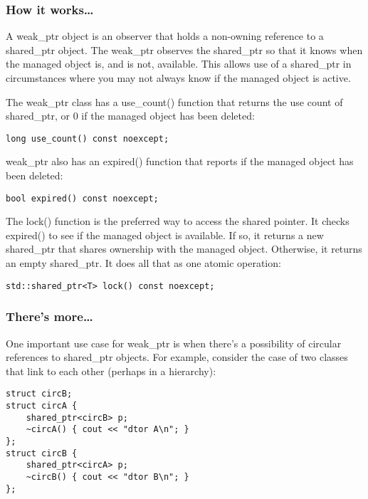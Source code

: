\subsubsection{How it works…}

A weak\_ptr object is an observer that holds a non-owning reference to a shared\_ptr object. The weak\_ptr observes the shared\_ptr so that it knows when the managed object is, and is not, available. This allows use of a shared\_ptr in circumstances where you may not always know if the managed object is active.

The weak\_ptr class has a use\_count() function that returns the use count of shared\_ptr, or 0 if the managed object has been deleted:

\begin{lstlisting}[style=styleCXX]
long use_count() const noexcept;
\end{lstlisting}

weak\_ptr also has an expired() function that reports if the managed object has been deleted:

\begin{lstlisting}[style=styleCXX]
bool expired() const noexcept;
\end{lstlisting}

The lock() function is the preferred way to access the shared pointer. It checks expired() to see if the managed object is available. If so, it returns a new shared\_ptr that shares ownership with the managed object. Otherwise, it returns an empty shared\_ptr. It does all that as one atomic operation:

\begin{lstlisting}[style=styleCXX]
std::shared_ptr<T> lock() const noexcept;
\end{lstlisting}


\subsubsection{There's more…}

One important use case for weak\_ptr is when there's a possibility of circular references to shared\_ptr objects. For example, consider the case of two classes that link to each other (perhaps in a hierarchy):

\begin{lstlisting}[style=styleCXX]
struct circB;
struct circA {
	shared_ptr<circB> p;
	~circA() { cout << "dtor A\n"; }
};
struct circB {
	shared_ptr<circA> p;
	~circB() { cout << "dtor B\n"; }
};
\end{lstlisting}


